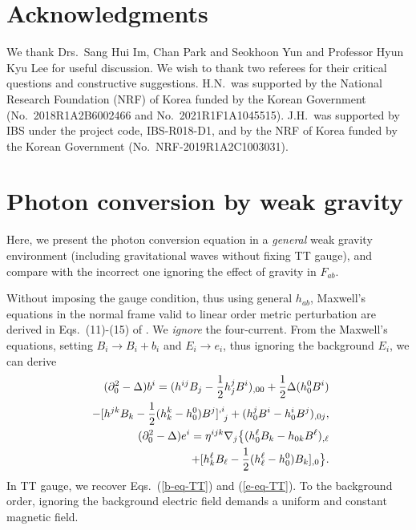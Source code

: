 \documentclass[twocolumn,amsmath,amssymb]{revtex4}
\newcommand{\bea}{\begin{eqnarray}}
\newcommand{\eea}{\end{eqnarray}}
\begin{document}
%
%
%
\section*{Acknowledgments}

We thank Drs.\ Sang Hui Im, Chan Park and Seokhoon Yun and Professor Hyun Kyu Lee for useful discussion. We wish to thank two referees for their critical questions and constructive suggestions. H.N.\ was supported by the National Research Foundation (NRF) of Korea funded by the Korean Government (No.\ 2018R1A2B6002466 and No.\ 2021R1F1A1045515). J.H.\ was supported by IBS under the project code, IBS-R018-D1, and by the NRF of Korea funded by the Korean Government (No.\ NRF-2019R1A2C1003031).


\appendix
\section{Photon conversion by weak gravity}
                                        \label{sec:WG}

Here, we present the photon conversion equation in a {\it general} weak gravity environment (including gravitational waves without fixing TT gauge), and compare with the incorrect one ignoring the effect of gravity in $F_{ab}$.

Without imposing the gauge condition, thus using general $h_{ab}$, Maxwell's equations in the normal frame valid to linear order metric perturbation are derived in Eqs.\ (11)-(15) of \cite{EM-definition}. We {\it ignore} the four-current. From the Maxwell's equations, setting $B_i \rightarrow B_i + b_i$ and $E_i \rightarrow e_i$, thus ignoring the background $E_i$, we can derive
\bea
   & & \hskip -.9cm
       ( \partial_0^2 - \Delta ) b^i
       = ( h^{ij} B_j - {1 \over 2} h^j_j B^i )_{,00}
       + {1 \over 2} \Delta ( h_0^0 B^i )
   \nonumber \\
   & & \hskip -.9cm
       \qquad
       - [ h^{jk} B_k - {1 \over 2} ( h^k_k - h^0_0 ) B^j
       ]^{,i}_{\;\;j}
       + ( h^j_0 B^i - h^i_0 B^j )_{,0j},
   \label{b-eq-general} \\
   & & \hskip -.9cm
       ( \partial_0^2 - \Delta ) e^i
       = \eta^{ijk} \nabla_j \big\{
       ( h_0^\ell B_k - h_{0k} B^\ell )_{,\ell}
   \nonumber \\
   & & \hskip -.9cm
       \qquad
       + [ h_k^\ell B_\ell
       - {1 \over 2} ( h^\ell_\ell - h^0_0 ) B_k ]_{,0}
       \big\}.
   \label{e-eq-general}
\eea
In TT gauge, we recover Eqs.\ (\ref{b-eq-TT}) and (\ref{e-eq-TT}). To the background order, ignoring the background electric field demands a uniform and constant magnetic field.
\end{document}
